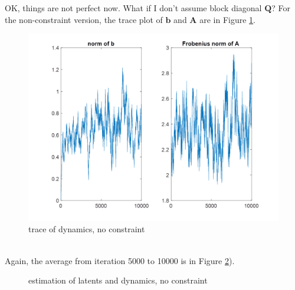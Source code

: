 \documentclass[]{article}
\begin{document}
OK, things are not perfect now. What if I don't assume block diagonal \(\mathbf{Q}\)? For the non-constraint version, the trace plot of \(\mathbf{b}\) and \(\mathbf{A}\) are in Figure \ref{trace of dynamics, full}.
\begin{figure}[h!]
	\centering
	\includegraphics[width = .7\textwidth]{image025.png}
	\caption{trace of dynamics, no constraint}
	\label{trace of dynamics, full}
\end{figure}\\


Again, the average from iteration 5000 to 10000 is in Figure \ref{lat and dyn, full}).\\
\begin{figure}[h!]
	\caption{estimation of latents and dynamics, no constraint}
	\label{lat and dyn, full}
\end{figure}
\end{document}

